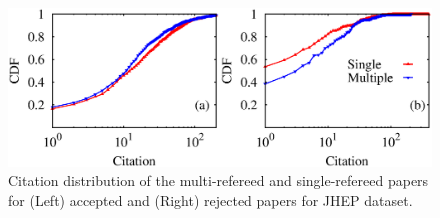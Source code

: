 %  
% 
% 
% 
% 
% 
% 
% 

% 
%
%

\begin{figure}
 \centering
 \includegraphics[scale = 0.4]{./texfiles/Chapter_4/cikm_17/figures/citation_jhep_1.eps}
 \caption{\label{citation:jhep} Citation distribution of the multi-refereed and single-refereed papers for (Left) accepted and (Right) rejected papers for JHEP dataset.} 
\end{figure}

